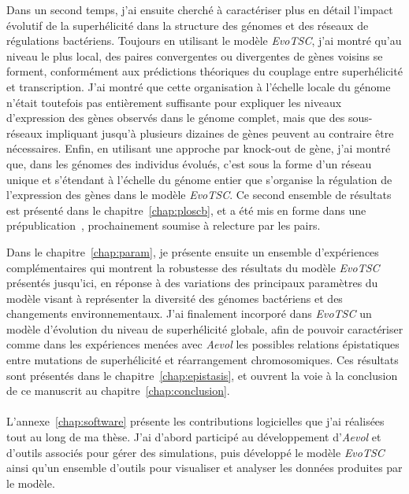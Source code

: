 Dans un second temps, j'ai ensuite cherché à caractériser plus en détail l'impact évolutif de la superhélicité dans la structure des génomes et des réseaux de régulations bactériens.
Toujours en utilisant le modèle \emph{EvoTSC}, j'ai montré qu'au niveau le plus local, des paires convergentes ou divergentes de gènes voisins se forment, conformément aux prédictions théoriques du couplage entre superhélicité et transcription.
J'ai montré que cette organisation à l'échelle locale du génome n'était toutefois pas entièrement suffisante pour expliquer les niveaux d'expression des gènes observés dans le génome complet, mais que des sous-réseaux impliquant jusqu'à plusieurs dizaines de gènes peuvent au contraire être nécessaires.
Enfin, en utilisant une approche par knock-out de gène, j'ai montré que, dans les génomes des individus évolués, c'est sous la forme d'un réseau unique et s'étendant à l'échelle du génome entier que s'organise la régulation de l'expression des gènes dans le modèle \emph{EvoTSC}.
Ce second ensemble de résultats est présenté dans le chapitre~\ref{chap:ploscb}, et a été mis en forme dans une prépublication~\citep{grohens2022b}, prochainement soumise à relecture par les pairs.

Dans le chapitre~\ref{chap:param}, je présente ensuite un ensemble d'expériences complémentaires qui montrent la robustesse des résultats du modèle \emph{EvoTSC} présentés jusqu'ici, en réponse à des variations des principaux paramètres du modèle visant à représenter la diversité des génomes bactériens et des changements environnementaux.
J'ai finalement incorporé dans \emph{EvoTSC} un modèle d'évolution du niveau de superhélicité globale, afin de pouvoir caractériser comme dans les expériences menées avec \emph{Aevol} les possibles relations épistatiques entre mutations de superhélicité et réarrangement chromosomiques.
Ces résultats sont présentés dans le chapitre~\ref{chap:epistasis}, et ouvrent la voie à la conclusion de ce manuscrit au chapitre~\ref{chap:conclusion}.

\paragraph{}
L'annexe~\ref{chap:software} présente les contributions logicielles que j'ai réalisées tout au long de ma thèse.
J'ai d'abord participé au développement d'\emph{Aevol} et d'outils associés pour gérer des simulations, puis développé le modèle \emph{EvoTSC} ainsi qu'un ensemble d'outils pour visualiser et analyser les données produites par le modèle.

